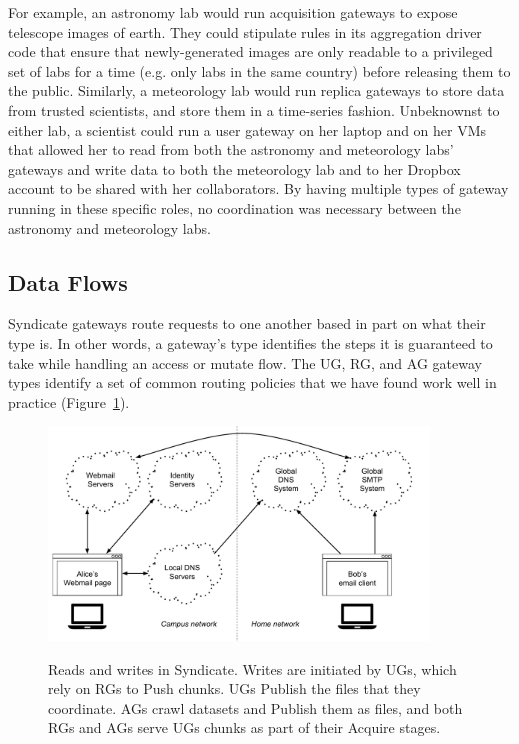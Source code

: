 For example, an astronomy lab would
run acquisition gateways to expose telescope images of earth.  They could stipulate rules
in its aggregation driver code that ensure that newly-generated images are only
readable to a privileged set of labs for a time (e.g. only labs in the same
country) before releasing them to the public.  Similarly, a meteorology
lab would run replica gateways to store data from trusted scientists, and
store them in a time-series fashion.  Unbeknownst to either lab, a scientist could
run a user gateway on her laptop and on her VMs that allowed her to read from both the
astronomy and meteorology labs' gateways and write data to both the meteorology
lab and to her Dropbox account to be shared with her collaborators.  By having
multiple types of gateway running in these specific roles, no coordination was
necessary between the astronomy and meteorology labs.

\subsection{Data Flows}

Syndicate gateways route requests to one another based in part on what their
type is.  In other words, a gateway's type identifies the steps it is guaranteed
to take while handling an access or mutate flow.
The UG, RG, and AG gateway types identify a set of common routing policies that
we have found work well in practice
(Figure~\ref{fig:chap3-syndicate-reads-writes}).

\begin{figure}[h]
   \caption{Reads and writes in Syndicate.  Writes are initiated by UGs, which
   rely on RGs to Push chunks.  UGs Publish the files that they coordinate.  AGs
   crawl datasets and Publish them as files, and both RGs and AGs serve UGs
   chunks as part of their Acquire stages.}
   \centering
   \includegraphics[width=0.9\textwidth,page=21]{figures/dissertation-figures}
   \label{fig:chap3-syndicate-reads-writes}
\end{figure}

